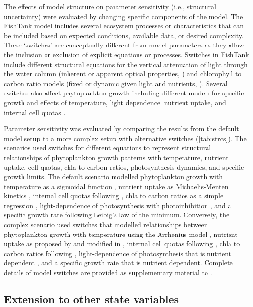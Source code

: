 \documentclass[letterpaper,12pt,oneside]{article}\usepackage[]{graphicx}\usepackage[]{color}
\begin{document}
The effects of model structure on parameter sensitivity (i.e., structural uncertainty) were evaluated by changing specific components of the model.  The FishTank model includes several ecosystem processes or characteristics that can be included based on expected conditions, available data, or desired complexity.  These `switches' are conceptually different from model parameters as they allow the inclusion or exclusion of explicit equations or processes.  Switches in FishTank include different structural equations for the vertical attenuation of light through the water column (inherent or apparent optical properties, \citealt{Penta09,Eldridge10}) and chlorophyll to carbon ratio models (fixed or dynamic given light and nutrients, \citealt{Cloern95}).  Several switches also affect phytoplankton growth including different models for specific growth and effects of temperature, light dependence, nutrient uptake, and internal cell quotas .  

Parameter sensitivity was evaluated by comparing the results from the default model setup to a more complex setup with alternative switches (\cref{tab:strcs}).  The scenarios used switches for different equations to represent structural relationships of phytoplankton growth patterns with temperature, nutrient uptake, cell quotas, \ac{chla} to carbon ratios, photosynthesis dynamics, and specific growth limits. The default scenario modelled phytoplankton growth with temperature as a sigmoidal function \citep{Eldridge10}, nutrient uptake as Michaelis-Menten kinetics \citep{Dugdale67}, internal cell quotas following \citet{Droop73}, \ac{chla} to carbon ratios as a simple regression \citep{Murrell14}, light-dependence of photosynthesis with photoinhibition \citep{Platt80}, and a specific growth rate following Leibig's law of the minimum.  Conversely, the complex scenario used switches that modelled relationships between phytoplankton growth with temperature using the Arrhenius model \citep{Geider97}, nutrient uptake as proposed by \citet{Lehman75} and modified in \citet{Geider98}, internal cell quotas following \citet{Flynn03}, \ac{chla} to carbon ratios following \citet{Cloern95}, light-dependence of photosynthesis that is nutrient dependent \citep{Flynn03}, and a specific growth rate that is nutrient dependent.  Complete details of model switches are provided as supplementary material to .

\subsection{Extension to other state variables}
\end{document}
